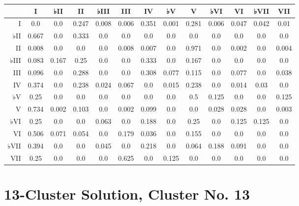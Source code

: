 \begin{table}[htbp]
\begin{minipage}{\linewidth}
\setlength{\tymax}{0.5\linewidth}
\centering
\small
\begin{tabulary}{\textwidth}{@{}RCCCCCCCCCCCC@{}} \toprule
&I&♭II&II&♭III&III&IV&♭V&V&♭VI&VI&♭VII&VII\\
\midrule
I&0.0&0.0&0.247&0.008&0.006&0.351&0.001&0.281&0.006&0.047&0.042&0.01\\
♭II&0.667&0.0&0.333&0.0&0.0&0.0&0.0&0.0&0.0&0.0&0.0&0.0\\
II&0.008&0.0&0.0&0.0&0.008&0.007&0.0&0.971&0.0&0.002&0.0&0.004\\
♭III&0.083&0.167&0.25&0.0&0.0&0.333&0.0&0.167&0.0&0.0&0.0&0.0\\
III&0.096&0.0&0.288&0.0&0.0&0.308&0.077&0.115&0.0&0.077&0.0&0.038\\
IV&0.374&0.0&0.238&0.024&0.067&0.0&0.015&0.238&0.0&0.014&0.03&0.0\\
♭V&0.25&0.0&0.0&0.0&0.0&0.0&0.0&0.5&0.125&0.0&0.0&0.125\\
V&0.734&0.002&0.103&0.0&0.002&0.099&0.0&0.0&0.028&0.028&0.0&0.003\\
♭VI&0.25&0.0&0.0&0.063&0.0&0.188&0.0&0.25&0.0&0.125&0.125&0.0\\
VI&0.506&0.071&0.054&0.0&0.179&0.036&0.0&0.155&0.0&0.0&0.0&0.0\\
♭VII&0.394&0.0&0.0&0.045&0.0&0.218&0.0&0.064&0.188&0.091&0.0&0.0\\
VII&0.25&0.0&0.0&0.0&0.625&0.0&0.125&0.0&0.0&0.0&0.0&0.0\\

\bottomrule

\end{tabulary}
\end{minipage}
\end{table}

\section{13-Cluster Solution, Cluster No. 13}
\label{13-clustersolutionclusterno.13}

